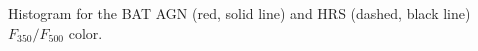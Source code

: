 \label{fig:hist_350_500_color} Histogram for the BAT AGN (red, solid line) and HRS (dashed, black line) $F_{350}/F_{500}$ color. 